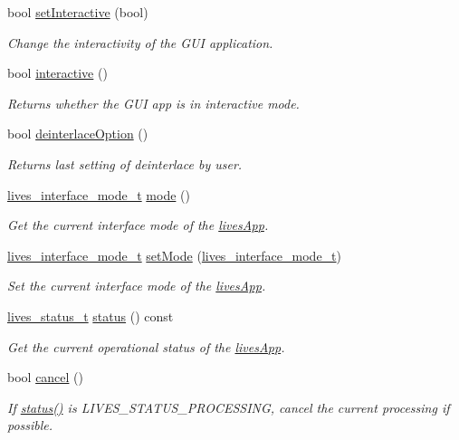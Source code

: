 \begin{DoxyCompactItemize}
bool \hyperlink{classlives_1_1livesApp_afd8f1e8b4d82a58639fd76acd95dbe88}{set\-Interactive} (bool)
\begin{DoxyCompactList}\small\item\em Change the interactivity of the G\-U\-I application. \end{DoxyCompactList}\item 
bool \hyperlink{classlives_1_1livesApp_a33b85eae23bbb5e55c9843b9016dcff9}{interactive} ()
\begin{DoxyCompactList}\small\item\em Returns whether the G\-U\-I app is in interactive mode. \end{DoxyCompactList}\item 
bool \hyperlink{classlives_1_1livesApp_a5df4681889c73269aa4b71cc92c98ee9}{deinterlace\-Option} ()
\begin{DoxyCompactList}\small\item\em Returns last setting of deinterlace by user. \end{DoxyCompactList}\item 
\hyperlink{liblives_8hpp_a3033beb0f401e14cbff66f72a4168d1f}{lives\-\_\-interface\-\_\-mode\-\_\-t} \hyperlink{classlives_1_1livesApp_aafa7b7f9c2666d097d0413e84bf4eccc}{mode} ()
\begin{DoxyCompactList}\small\item\em Get the current interface mode of the \hyperlink{classlives_1_1livesApp}{lives\-App}. \end{DoxyCompactList}\item 
\hyperlink{liblives_8hpp_a3033beb0f401e14cbff66f72a4168d1f}{lives\-\_\-interface\-\_\-mode\-\_\-t} \hyperlink{classlives_1_1livesApp_a0c47b6301e0656433ff6d74954ad6d1d}{set\-Mode} (\hyperlink{liblives_8hpp_a3033beb0f401e14cbff66f72a4168d1f}{lives\-\_\-interface\-\_\-mode\-\_\-t})
\begin{DoxyCompactList}\small\item\em Set the current interface mode of the \hyperlink{classlives_1_1livesApp}{lives\-App}. \end{DoxyCompactList}\item 
\hyperlink{liblives_8hpp_a4748f68756cfc1002a1b68425e91ecad}{lives\-\_\-status\-\_\-t} \hyperlink{classlives_1_1livesApp_afcb05464af9146f5efbb896f2611c8e7}{status} () const 
\begin{DoxyCompactList}\small\item\em Get the current operational status of the \hyperlink{classlives_1_1livesApp}{lives\-App}. \end{DoxyCompactList}\item 
bool \hyperlink{classlives_1_1livesApp_a1859f66dfda2d2a59b622be4f278e39a}{cancel} ()
\begin{DoxyCompactList}\small\item\em If \hyperlink{classlives_1_1livesApp_afcb05464af9146f5efbb896f2611c8e7}{status()} is L\-I\-V\-E\-S\-\_\-\-S\-T\-A\-T\-U\-S\-\_\-\-P\-R\-O\-C\-E\-S\-S\-I\-N\-G, cancel the current processing if possible. \end{DoxyCompactList}\end{DoxyCompactItemize}
